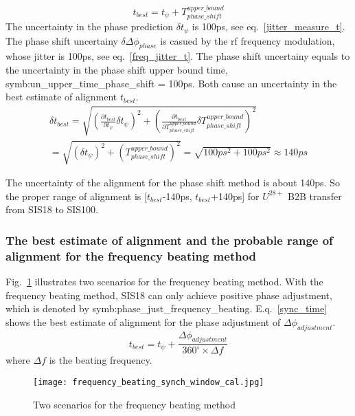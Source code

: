 \begin{equation}
t_{best} = t_{\psi} + T_{phase\_ shift}^{upper\_ bound} \label{Phase_win}
\end{equation}
The uncertainty in the phase prediction $\delta t_{\psi}$ is 100ps, see eq.~\ref{jitter_measure_t}. The phase shift uncertainy $\delta \Delta \phi_{phase}$ is casued by the rf frequency modulation, whose jitter is 100ps, see eq.~\ref{freq_jitter_t}. The phase shift uncertainy equals to the uncertainty in the phase shift upper bound time, \gls{symb:un_upper_time_phase_shift} = 100ps. Both cause an uncertainty in the best estimate of alignment $t_{best}$.
\begin{equation}
\begin{aligned}
\delta t_{best} =\sqrt {(\frac {\partial t_{best}}{\partial t_{\psi}}\delta t_{\psi})^2 + (\frac {\partial t_{best}}{\partial T_{phase\_ shift}^{upper\_ bound}}\delta T_{phase\_ shift}^{upper\_ bound})^2} \\
 =\sqrt {(\delta t_{\psi})^2+(T_{phase\_ shift}^{upper\_ bound})^2} =\sqrt { 100ps^2+100ps^2}\approx 140ps \label{Phase_uncertainty}
\end{aligned}
\end{equation}

The uncertainty of the alignment for the phase shift method is about 140ps. So the proper range of alignment is [$t_{best}$-140ps, $t_{best}$+140ps] for $U^{28+}$ B2B transfer from SIS18 to SIS100.
\subsubsection{The best estimate of alignment and the probable range of alignment for the frequency beating method}
Fig.~\ref{frequency_beating} illustrates two scenarios for the frequency beating method. With the frequency beating method, SIS18 can only achieve positive phase adjustment, which is denoted by \gls{symb:phase_just_frequency_beating}. E.q.~\ref{sync_time} shows the best estimate of alignment for the phase adjustment of $\Delta \phi_{adjustment}$.
\begin{equation}
	 t_{best} = t_{\psi}+\frac {\Delta \phi_{adjustment}}{{360^\circ} \times {\Delta f}} \label {sync_time}
   \end{equation}
where $\Delta f$ is the beating frequency.
\begin{figure}[!htb]
   \centering   
   \texttt{[image: frequency\_beating\_synch\_window\_cal.jpg]}
   \caption{Two scenarios for the frequency beating method}
   \label{frequency_beating}
\end{figure}

